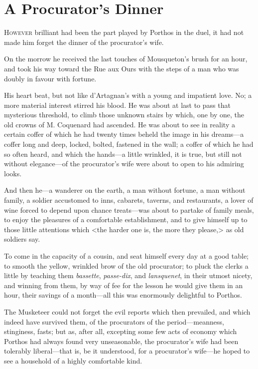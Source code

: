 
\chapter{A Procurator's Dinner}

\lettrine[]{H}{owever} brilliant had been the part played by Porthos in the duel, it had not made him forget the dinner of the procurator's wife. 

\zz
On the morrow he received the last touches of Mousqueton's brush for an hour, and took his way toward the Rue aux Ours with the steps of a man who was doubly in favour with fortune. 

His heart beat, but not like d'Artagnan's with a young and impatient love. No; a more material interest stirred his blood. He was about at last to pass that mysterious threshold, to climb those unknown stairs by which, one by one, the old crowns of M. Coquenard had ascended. He was about to see in reality a certain coffer of which he had twenty times beheld the image in his dreams---a coffer long and deep, locked, bolted, fastened in the wall; a coffer of which he had so often heard, and which the hands---a little wrinkled, it is true, but still not without elegance---of the procurator's wife were about to open to his admiring looks. 

And then he---a wanderer on the earth, a man without fortune, a man without family, a soldier accustomed to inns, cabarets, taverns, and restaurants, a lover of wine forced to depend upon chance treats---was about to partake of family meals, to enjoy the pleasures of a comfortable establishment, and to give himself up to those little attentions which <the harder one is, the more they please,> as old soldiers say. 

To come in the capacity of a cousin, and seat himself every day at a good table; to smooth the yellow, wrinkled brow of the old procurator; to pluck the clerks a little by teaching them \textit{bassette}, \textit{passe-dix}, and \textit{lansquenet}, in their utmost nicety, and winning from them, by way of fee for the lesson he would give them in an hour, their savings of a month---all this was enormously delightful to Porthos. 

The Musketeer could not forget the evil reports which then prevailed, and which indeed have survived them, of the procurators of the period---meanness, stinginess, fasts; but as, after all, excepting some few acts of economy which Porthos had always found very unseasonable, the procurator's wife had been tolerably liberal---that is, be it understood, for a procurator's wife---he hoped to see a household of a highly comfortable kind. 


